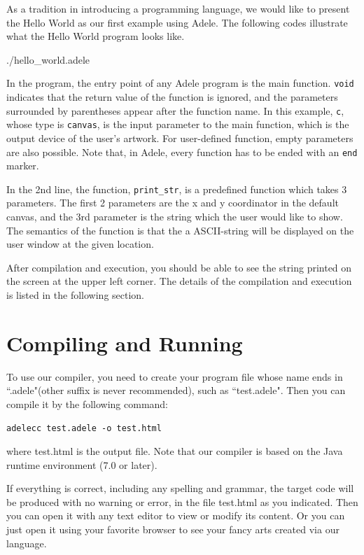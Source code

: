 \documentclass[11pt,letterpaper]{article}
\begin{document}
As a tradition in introducing a programming language, we would like to present the Hello World as our first example using Adele. The following codes illustrate what the Hello World program looks like.

 {./hello_world.adele}

In the program, the entry point of any Adele program is the main function. \texttt{void} indicates that the return value of the function is ignored, and the parameters surrounded by parentheses appear after the function name. In this example, \texttt{c}, whose type is \texttt{canvas}, is the input parameter to the main function, which is the output device of the user's artwork. For user-defined function, empty parameters are also possible. Note that, in Adele, every function has to be ended with an \texttt{end} marker.

In the 2nd line, the function, \texttt{print\_str}, is a predefined function which takes 3 parameters. The first 2 parameters are the x and y coordinator in the default canvas, and the 3rd parameter is the string which the user would like to show. The semantics of the function is that the a ASCII-string will be displayed on the user window at the given location.

After compilation and execution, you should be able to see the string printed on the screen at the upper left corner. The details of the compilation and execution is listed in the following section.

\section {Compiling and Running}
To use our compiler, you need to create your program file whose name ends in ``.adele"(other suffix is never recommended), such as ``test.adele". Then you can compile it by the following command:

\begin{lstlisting}[tabsize=4]
	adelecc test.adele -o test.html
\end{lstlisting}

where test.html is the output file. Note that our compiler is based on the Java runtime environment (7.0 or later).

If everything is correct, including any spelling and grammar, the target code will be produced with no warning or error, in the file test.html as you indicated. Then you can open it with any text editor to view or modify its content. Or you can just open it using your favorite browser to see your fancy arts created via our language.
\end{document}

